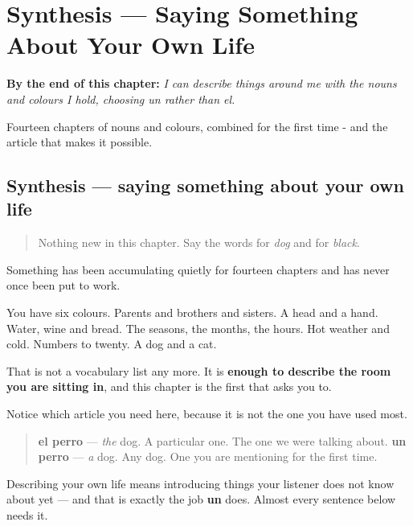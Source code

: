 
\chapter{Synthesis --- Saying Something About Your Own Life}
\label{ch:spanish-synthesis-describing}

\begin{chapteropening}
\textbf{By the end of this chapter:} \emph{I can describe things around me with the nouns and colours I hold, choosing un rather than el.}

Fourteen chapters of nouns and colours, combined for the first time - and the article that makes it possible.
\end{chapteropening}

\section[Practice]{Synthesis — saying something about your own life}

\label{lesson:ES-C40-sintesis-describir}



\begin{quote}
Nothing new in this chapter. Say the words for \emph{dog} and for \emph{black}.
\end{quote}

\begin{grammarlens}[title={What you've built}]
Something has been accumulating quietly for fourteen chapters and has never once been put to work.

You have six colours. Parents and brothers and sisters. A head and a hand. Water, wine and bread. The seasons, the months, the hours. Hot weather and cold. Numbers to twenty. A dog and a cat.

That is not a vocabulary list any more. It is \textbf{enough to describe the room you are sitting in}, and this chapter is the first that asks you to.
\end{grammarlens}

\begin{grammarlens}[title={Grammar Lens: the word that made this possible}]
Notice which article you need here, because it is not the one you have used most.

\begin{quote}
\textbf{el perro} — \emph{the} dog. A particular one. The one we were talking about. \textbf{un perro} — \emph{a} dog. Any dog. One you are mentioning for the first time.
\end{quote}

Describing your own life means introducing things your listener does not know about yet — and that is exactly the job \textbf{un} does. Almost every sentence below needs it.
\end{grammarlens}


